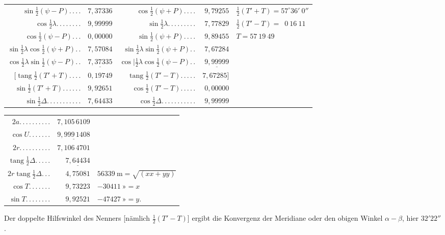 \begin{center}
\begingroup\fontsize{8}{11}\selectfont\setlength{\tabcolsep}{3pt}\renewcommand{\arraystretch}{1.4}
\begin{tabular}{@{}r@{ }r@{\quad}r@{ }r@{\quad}l@{}}
$\sin\tfrac12(\psi-P).\,.\,.\,.$&$7{,}37336$&$\cos\tfrac12(\psi+P).\,.\,.\,.$&$9{,}79255$&$\tfrac12(T'+T)=57^\circ36'\ 0''$\\
$\cos\tfrac12\lambda.\,.\,.\,.\,.\,.\,.\,.$&$9{,}99999$&$\sin\tfrac12\lambda.\,.\,.\,.\,.\,.\,.\,.\,.$&$7{,}77829$&$\tfrac12(T'-T)=\phantom{5}0\ 16\ 11$\\
$\cos\tfrac12(\psi-P).\,.\,.$&$0{,}00000$&$\sin\tfrac12(\psi+P).\,.\,.\,.$&$9{,}89455$&$T=57\ 19\ 49$\\\cline{1-2}\cline{3-4}
$\sin\tfrac12\lambda\cos\tfrac12(\psi+P).\,.$&$7{,}57084$&$\sin\tfrac12\lambda\sin\tfrac12(\psi+P).\,.$&$7{,}67284$&\\
$\cos\tfrac12\lambda\sin\tfrac12(\psi-P).\,.$&$\underline{7{,}37335}$&$\cos\mathord{|}\tfrac12\lambda\cos\tfrac12(\psi-P).\,.$&$\underline{9{,}99999}$&\\
$[\operatorname{tang}\tfrac12(T'+T).\,.\,.\,.$&$0{,}19749$&$\operatorname{tang}\tfrac12(T'-T).\,.\,.\,.\,.$&$7{,}67285]$&\\
$\sin\tfrac12(T'+T).\,.\,.\,.\,.\,.$&$9{,}92651$&$\cos\tfrac12(T'-T).\,.\,.\,.\,.$&$0{,}00000$&\\
$\sin\tfrac12\Delta.\,.\,.\,.\,.\,.\,.\,.\,.\,.\,.$&$7{,}64433$&$\cos\tfrac12\Delta.\,.\,.\,.\,.\,.\,.\,.\,.\,.\,.$&$9{,}99999$&
\end{tabular}\par\endgroup
\end{center}
\begin{center}
\begingroup\small\renewcommand{\arraystretch}{1.15}
\begin{tabular}{r@{ }r@{\qquad}l}
$2a.\,.\,.\,.\,.\,.\,.\,.\,.\,.$&$7{,}105\,6109$&\\
$\cos U.\,.\,.\,.\,.\,.\,.$&$\underline{9{,}999\,1408}$&\\
$2r.\,.\,.\,.\,.\,.\,.\,.\,.\,.$&$7{,}106\,4701$&\\
$\operatorname{tang}\tfrac12\Delta.\,.\,.\,.\,.$&$\underline{7{,}64434}$&\\
$2r\operatorname{tang}\tfrac12\Delta.\,.\,.$&$4{,}75081$&$56339\ \mathrm m=\sqrt{(xx+yy)}$\\
$\cos T.\,.\,.\,.\,.\,.\,.$&$9{,}73223$&$-30411\ \text{»}=x$\\
$\sin T.\,.\,.\,.\,.\,.\,.\,.$&$9{,}92521$&$-47427\ \text{»}=y.$
\end{tabular}\par\endgroup
\end{center}
Der doppelte Hilfswinkel des Nenners [nämlich $\tfrac12(T'-T)$] ergibt die Konvergenz der Meridiane oder den obigen Winkel $\alpha-\beta$, hier $32'22''$.

